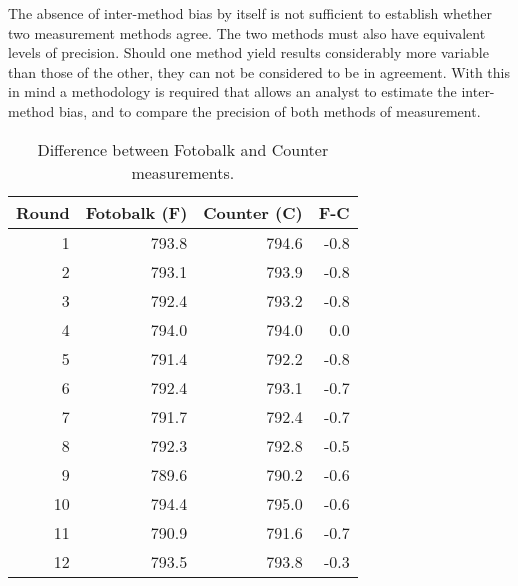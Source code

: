 \documentclass[12pt, a4paper]{report}
\theoremstyle{plain}
\theoremstyle{definition}
\theoremstyle{remark}
\begin{document}
	The absence of inter-method bias by itself is not sufficient to
	establish whether two measurement methods agree. The two methods
	must also have equivalent levels of precision. Should one method
	yield results considerably more variable than those of the other,
	they can not be considered to be in agreement. With this in mind a
	methodology is required that allows an analyst to estimate the
	inter-method bias, and to compare the precision of both methods of
	measurement.
	\newpage
	\begin{table}[h!]
		
		\begin{center}
			
			\begin{tabular}{rrrr}
				\hline
				Round& Fotobalk (F) & Counter (C) & F-C \\
				\hline
				1 & 793.8& 794.6 & -0.8 \\
				2 & 793.1 & 793.9 & -0.8 \\
				3 & 792.4 & 793.2 & -0.8 \\
				4 & 794.0 & 794.0 & 0.0 \\
				5 & 791.4 & 792.2 & -0.8 \\
				6 & 792.4 & 793.1 & -0.7 \\
				7 & 791.7 & 792.4 & -0.7 \\
				8 & 792.3 & 792.8 & -0.5 \\
				9 & 789.6 & 790.2 & -0.6 \\
				10 & 794.4 & 795.0 & -0.6 \\
				11 & 790.9 & 791.6 & -0.7 \\
				12 & 793.5 & 793.8 & -0.3 \\
				\hline
			\end{tabular}
			\caption{Difference between Fotobalk and Counter measurements.}
		\end{center}
	\end{table}
	
	
	
	
	
	
	
	
\end{document}
